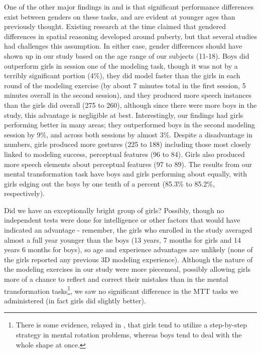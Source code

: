 One of the other major findings in \cite{ehrlich2006importance} and
\cite{levine1999early} is that significant performance differences exist between
genders on these tasks, and are evident at younger ages than previously thought.
Existing research at the time claimed that gendered differences in spatial
reasoning developed around puberty, but that several studies had challenges this
assumption. In either case, gender differences should have shown up in our study
based on the age range of our subjects (11-18). Boys did outperform girls in
session one of the modeling task,  though it was not by a terribly significant
portion (4\%), they did model faster than the girls in each round of the
modeling exercise (by about 7 minutes total in the first session, 5 minutes
overall in the second session), and they produced more speech instances than the
girls did overall (275 to 260), although since there were more boys in the
study, this advantage is negligible at best. Interestingly, our findings had
girls performing better in many areas; they outperformed boys in the second
modeling session by 9\%, and across both sessions by almost 3\%. Despite a
disadvantage in numbers, girls produced more gestures (225 to 188) including
those most closely linked to modeling success, perceptual features (96 to 84).
Girls also produced more speech elements about perceptual features (97 to 89).
The results from our mental transformation task have boys and girls performing
about equally, with girls edging out the boys by one tenth of a percent (85.3\%
to 85.2\%, respectively).

Did we have an exceptionally bright group of girls? Possibly, though no
independent tests were done for intelligence or other factors that would have
indicated an advantage - remember, the girls who enrolled in the study averaged
almost a full year younger than the boys (13 years, 7 months for girls and 14
years 6 months for boys), so age and experience advantages are unlikely (none of
the girls reported any previous 3D modeling experience). Although the nature of
the modeling exercises in our study were more piecemeal, possibly allowing girls
more of a chance to reflect and correct their mistakes than in the mental
transformation tasks\footnote{There is some evidence, relayed in
\cite{ehrlich2006importance}, that girls tend to utilize a step-by-step strategy
in mental rotation problems, whereas boys tend to deal with the whole shape at
once.}, we saw no significant difference in the MTT tasks we administered (in
fact girls did slightly better).

